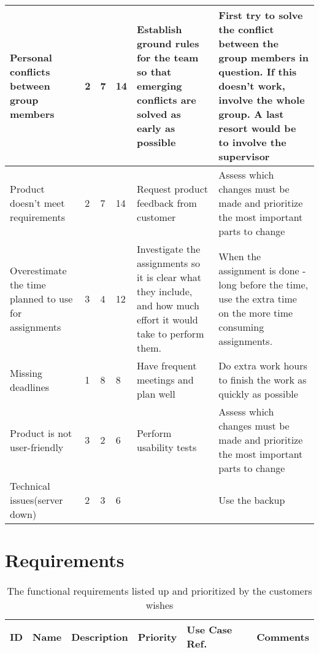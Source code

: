 \begin{appendices}
\begin{longtable}{ | p{3.5cm} | p{2cm} | p{1.5cm} | p{2cm} | p{3.5cm} | p{3.5cm} |}
	Personal conflicts between group members & 2 & 7 & 14 & Establish ground rules for the team so that emerging conflicts are solved as early as possible & First try to solve the conflict between the group members in question. If this doesn't work, involve the whole group. A last resort would be to involve the supervisor \\ \hline
	
	Product doesn't meet requirements & 2 & 7 & 14 & Request product feedback from customer & Assess which changes must be made and prioritize the most important parts to change \\ \hline
	
	Overestimate the time planned to use for assignments & 3 & 4 & 12 & Investigate the assignments so it is clear what they include, and how much effort it would take to perform them. & When the assignment is done - long before the time, use the extra time on the more time consuming assignments. \\ \hline
	
	Missing deadlines & 1 & 8 & 8 & Have frequent meetings and plan well & Do extra work hours to finish the work as quickly as possible \\ \hline
	
	Product is not user-friendly & 3 & 2 & 6 & Perform usability tests & Assess which changes must be made and prioritize the most important parts to change \\ \hline
	
	Technical issues(server down) & 2 & 3 & 6 & & Use the backup \\ \hline
\end{longtable}

\noindent
\chapter{Requirements}
\label{app:requirements}

\renewcommand{\arraystretch}{2}
\begin{center}
	\begin{longtable}{ | p{1cm} | p{3cm} | p{5cm} | p{1.5cm} | p{2.5cm} | p{3cm} | }
	\caption[Functional requirements]{The functional requirements listed up and  prioritized by the customers wishes} \label{Tab_unittestcases}\\
	
	\hline {\bf ID} & {\bf Name} & {\bf Description} & {\bf Priority} & {\bf Use Case Ref.} & {\bf Comments}\\ \hline
	

\end{longtable}
\end{center}
\end{appendices}
